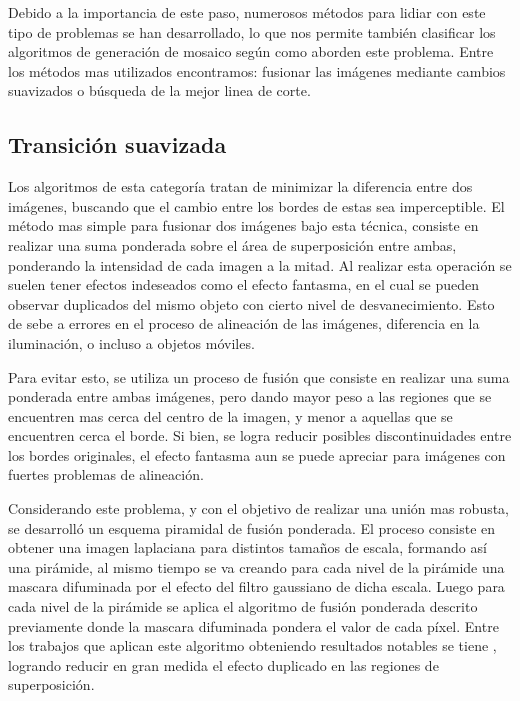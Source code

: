 Debido a la importancia de este paso, numerosos métodos para lidiar con este tipo de problemas se han desarrollado, lo que nos permite también clasificar los algoritmos de generación de mosaico según como aborden este problema. Entre los métodos mas utilizados encontramos: fusionar las imágenes mediante cambios suavizados o búsqueda de la mejor linea de corte.

\subsection*{Transición suavizada}

Los algoritmos de esta categoría tratan de minimizar la diferencia entre dos imágenes, buscando que el cambio entre los bordes de estas sea imperceptible. El método mas simple para fusionar dos imágenes bajo esta técnica, consiste en realizar una suma ponderada sobre el área de superposición entre ambas, ponderando la intensidad de cada imagen a la mitad. Al realizar esta operación se suelen tener efectos indeseados como el efecto fantasma, en el cual se pueden observar duplicados del mismo objeto con cierto nivel de desvanecimiento. Esto de sebe a errores en el proceso de alineación de las imágenes, diferencia en la iluminación, o incluso a objetos móviles. 

Para evitar esto, se utiliza un proceso de fusión que consiste en realizar una suma ponderada entre ambas imágenes, pero dando mayor peso a las regiones que se encuentren mas cerca del centro de la imagen, y menor a aquellas que se encuentren cerca el borde. Si bien, se logra reducir posibles discontinuidades entre los bordes originales, el efecto fantasma aun se puede apreciar para imágenes con fuertes problemas de alineación.

Considerando este problema, y con el objetivo de realizar una unión mas robusta, se desarrolló un esquema piramidal de fusión ponderada. El proceso consiste en obtener una imagen laplaciana para distintos tamaños de escala, formando así una pirámide, al mismo tiempo se va creando para cada nivel de la pirámide una mascara difuminada por el efecto del filtro gaussiano de dicha escala. Luego para cada nivel de la pirámide se aplica el algoritmo de fusión ponderada descrito previamente donde la mascara  difuminada pondera el valor de cada píxel. Entre los trabajos que aplican este algoritmo obteniendo resultados notables se tiene \cite{multiband}, logrando reducir en gran medida el efecto duplicado en las regiones de superposición.

